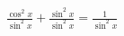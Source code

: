\documentclass[preview]{standalone}
\begin{document}
\begin{align*}
\frac{\cos^2x}{\sin^2x}+ \frac{\sin^2x}{\sin^2x} = \frac{1}{\sin^2x}
\end{align*}
\end{document}
